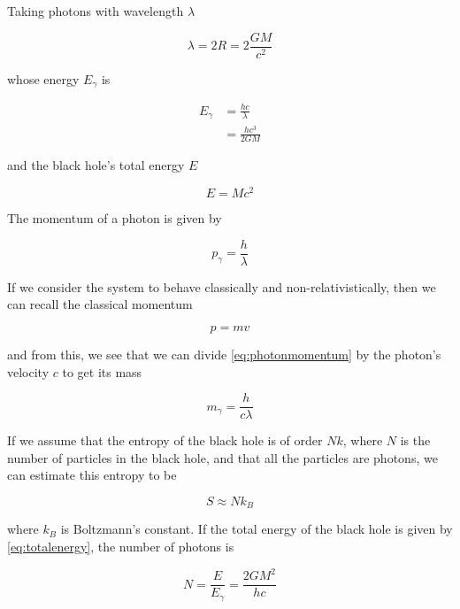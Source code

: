 \documentclass[9pt,a4paper,twocolumn]{article}
\begin{document}
\begin{enumerate}[(a)]
Taking photons with wavelength $\lambda$

\begin{equation}\label{eq:wavelen}
	\lambda = 2R = 2\frac{GM}{c^2}
\end{equation}

whose energy $E_\gamma$ is

\begin{align}
	E_\gamma &= \frac{hc}{\lambda} \\
	&= \frac{hc^3}{2GM} \label{eq:photonenergy}
\end{align}

and the black hole's total energy $E$

\begin{equation}\label{eq:totalenergy}
	E = Mc^2%
\end{equation}

The momentum of a photon is given by

\begin{equation}\label{eq:photonmomentum}
	p_\gamma = \frac{h}{\lambda}
\end{equation}

If we consider the system to behave classically and non-relativistically, then we can recall the classical momentum

\begin{equation}\label{eq:classicalmomentum}
	p = mv
\end{equation}

and from this, we see that we can divide \eqref{eq:photonmomentum} by the photon's velocity $c$ to get its mass

\begin{equation}\label{eq:photonmass}
	m_\gamma = \frac{h}{c\lambda}
\end{equation}

If we assume that the entropy of the black hole is of order $Nk$, where $N$ is the number of particles in the black hole, and that all the particles are photons, we can estimate this entropy to be

\begin{equation}\label{eq:bhentropy}
	S \approx Nk_B
\end{equation}

where $k_B$ is Boltzmann's constant. If the total energy of the black hole is given by \eqref{eq:totalenergy}, the number of photons is

\begin{equation}
	N = \frac{E}{E_\gamma} = \frac{2GM^2}{hc}
\end{equation}


\end{enumerate}
\end{document}
